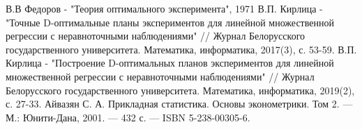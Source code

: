 \begin{thebibliography}{}
	 В.В Федоров - "Теория оптимального эксперимента", 1971
	 В.П. Кирлица - "Точные  D-оптимальные планы экспериментов для линейной множественной регрессии с неравноточными наблюдениями" // Журнал Белорусского государственного университета. Математика, информатика, 2017(3), с. 53-59.
	 В.П. Кирлица - "Построение  D-оптимальных  планов экспериментов для линейной множественной регрессии с неравноточными наблюдениями" // Журнал Белорусского государственного университета. Математика, информатика, 2019(2), с. 27-33.
	 Айвазян С. А. Прикладная статистика. Основы эконометрики. Том 2. — М.: Юнити-Дана, 2001. — 432 с. — ISBN 5-238-00305-6. 
\end{thebibliography}

